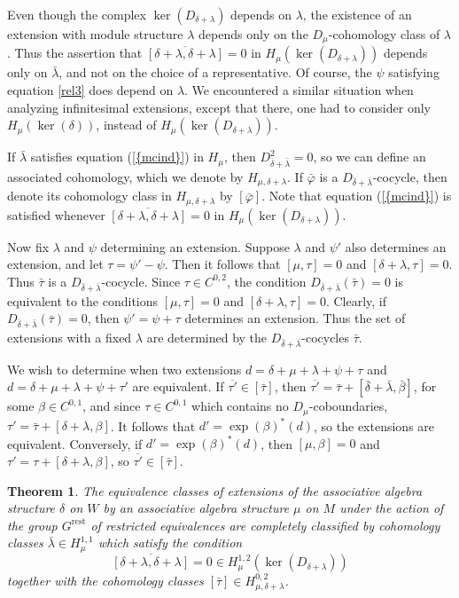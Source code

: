 \documentclass[12pt]{amsart}
\newtheorem{thm}{Theorem}[section]
\theoremstyle{definition}
\begin{document}
Even though the complex
$\ker(D_{\delta+\lambda})$ depends on $\lambda$,
the existence of an extension with module structure
$\lambda$ depends only on the $D_\mu$-cohomology
class of $\lambda$.
Thus the assertion that $\overline{[\delta+\lambda,\delta+\lambda]}=0$ in
${H_\mu(\ker(D_{\delta+\lambda}))}$ depends only on $\bar\lambda$,
and not on the choice of a representative. Of course, the $\psi$
satisfying equation \eqref{rel3} does depend on $\lambda$.
We encountered a similar situation when
analyzing infinitesimal extensions, except that there,
one had to consider only $H_\mu(\ker(\delta))$,
instead of ${H_\mu(\ker(D_{\delta+\lambda}))}$.

If $\bar\lambda$ satisfies {equation (\ref{{mcind}})} in ${H_\mu}$, then $D_{\bar\delta+\bar\lambda}^2=0$,
so we can define an associated cohomology,
which we denote by
${H_{\mu,\delta+\lambda}}$. If $\bar{\varphi}$ is a $D_{\bar\delta+\bar\lambda}$-cocycle, then denote its cohomology class in ${H_{\mu,\delta+\lambda}}$ by
$[\bar{\varphi}]$. Note that {equation (\ref{{mcind}})} is satisfied whenever
$\overline{[\delta+\lambda,\delta+\lambda]}=0$ in
${H_\mu(\ker(D_{\delta+\lambda}))}$.

Now fix $\lambda$ and $\psi$ determining an extension.
Suppose $\lambda$ and $\psi'$ also determines an extension,
and let $\tau=\psi'-\psi$. Then it follows that $[\mu,\tau]=0$  and
$[\delta+\lambda,\tau]=0$. Thus $\bar\tau$ is a $D_{\bar\delta+\bar\lambda}$-cocycle.
Since $\tau\in C^{0,2}$, the condition $D_{\bar\delta+\bar\lambda}(\bar\tau)=0$ is equivalent
to the conditions $[\mu,\tau]=0$ and
$[\delta+\lambda,\tau]=0$. Clearly, if $D_{\bar\delta+\bar\lambda}(\bar\tau)=0$,
then $\psi'=\psi+\tau$ determines an extension.
Thus the set of extensions with a fixed $\lambda$ are determined
by the $D_{\bar\delta+\bar\lambda}$-cocycles $\bar\tau$.

We wish to determine when two extensions
$d=\delta+\mu+\lambda+\psi+\tau$ and
$d=\delta+\mu+\lambda+\psi+\tau'$ are equivalent.  If
$\overline{\tau'}\in [\bar\tau]$, then
$\overline{\tau'}=\bar\tau+[{\bar\delta+\bar\lambda},\bar\beta]$, for some $\beta\in
C^{0,1}$, and since $\tau\in C^{0,1}$ which contains no
$D_\mu$-coboundaries, $\tau'=\bar\tau+[\delta+\lambda,\beta]$. It
follows that $d'=\exp(\beta)^*(d)$, so the extensions are
equivalent. Conversely, if $d'=\exp(\beta)^*(d)$, then
$[\mu,\beta]=0$ and  $\tau'=\tau+[{\delta+\lambda},\beta]$, so
$\overline{\tau'}\in[\bar\tau]$.
\begin{thm}\label{th5}
The equivalence classes of extensions of the associative algebra
structure $\delta$ on $W$ by an associative algebra structure
$\mu$ on $M$ under the action of the group ${\mbox{$G^{\text{rest}}$}}$ of restricted
equivalences are completely classified by cohomology classes
$\bar\lambda\in H_\mu^{1,1}$ which satisfy the condition
$$\overline{[\delta+\lambda,\delta+\lambda]}=0\in H_{\mu}^{1,2}(\ker(D_{\delta+\lambda}))$$
together with the cohomology classes $[\bar\tau]\in H_{\mu,\delta+\lambda}^{0,2}$.
\end{thm}
\end{document}
